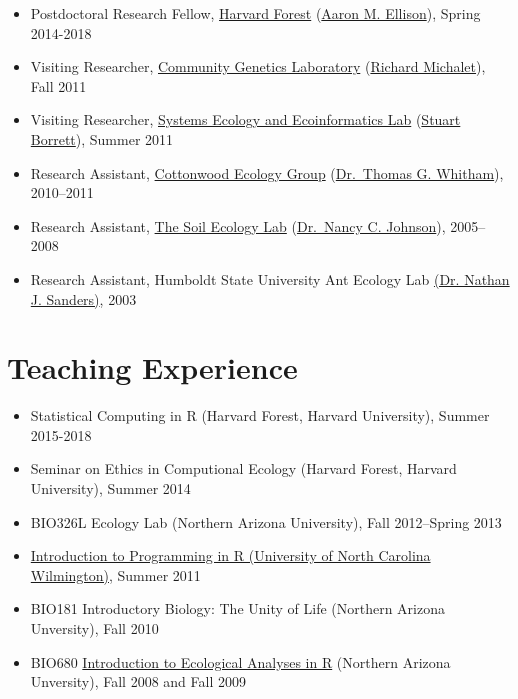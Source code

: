 \documentclass[a4paper]{article}
\begin{document}
\begin{itemize}
\item
  Postdoctoral Research Fellow, 
  \href{http://harvardforest.fas.harvard.edu/}{Harvard Forest}
  (\href{http://harvardforest.fas.harvard.edu/aaron-ellison}{Aaron M. Ellison}), Spring 2014-2018
\item
  Visiting Researcher,
  \href{https://www4.bordeaux-aquitaine.inra.fr/biogeco/}{Community
  Genetics Laboratory}
  (\href{http://www4.bordeaux-aquitaine.inra.fr/biogeco_eng/People/Former-members/Michalet-Richard}{Richard Michalet}), Fall 2011
\item
  Visiting Researcher, \href{http://people.uncw.edu/borretts/}{Systems
  Ecology and Ecoinformatics Lab}
  (\href{http://people.uncw.edu/borretts/people.html}{Stuart
  Borrett}), Summer 2011
\item
  Research Assistant, \href{http://www.poplar.nau.edu/}{Cottonwood
  Ecology Group}
  (\href{http://www.poplar.nau.edu/people.php?mode=showus\&user=tgw}{Dr.~Thomas
  G. Whitham}), 2010--2011
\item
  Research Assistant,
  \href{http://www.nau.edu/~envsci/johnsonlab/index.htm}{The Soil
  Ecology Lab}
  (\href{http://www.nau.edu/~envsci/johnsonlab/NCJ.htm}{Dr.~Nancy C.
  Johnson}), 2005--2008
\item
  Research Assistant, Humboldt State University Ant Ecology Lab
  \href{http://web.utk.edu/~nsanders/nate.html}{(Dr. Nathan J.
  Sanders)}, 2003
\end{itemize}

\section{Teaching Experience}\label{teaching-experience}

\begin{itemize}
\item
  Statistical Computing in R (Harvard Forest, Harvard
  University), Summer 2015-2018
\item
  Seminar on Ethics in Computional Ecology (Harvard Forest, Harvard
  University), Summer 2014
\item
  BIO326L Ecology Lab (Northern Arizona University), Fall 2012--Spring
  2013
\item
  \href{http://people.uncw.edu/borretts/courses/RworkshopUNCW.pdf}{Introduction
  to Programming in R (University of North Carolina Wilmington)}, Summer
  2011
\item
  BIO181 Introductory Biology: The Unity of Life (Northern Arizona
  Unversity), Fall 2010
\item
  BIO680
  \href{http://www.mpcer.nau.edu/igert/eco_analysis_r.html}{Introduction
  to Ecological Analyses in R} (Northern Arizona Unversity), Fall 2008
  and Fall 2009
\end{itemize}
\end{document}
